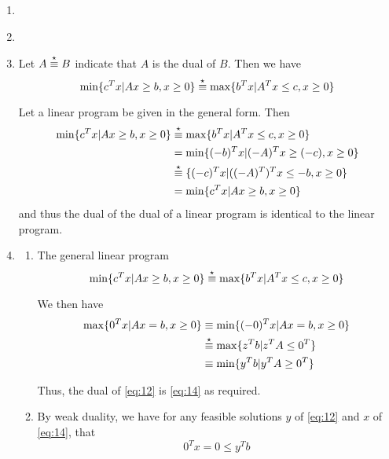 \begin{enumerate}
\item \label{item:2}
  
\item \label{item:3}
  
\item \label{item:4}
  Let $A \overset{\star}\equiv B$ indicate that $A$ is the dual of $B$.  Then we have
  \begin{equation}
    \label{eq:2}
    \min \{ c^{T}x | Ax \geq b, x \geq 0 \} \overset{\star}\equiv \max \{ b^{T} x |
    A^{T}x \leq c, x \geq 0 \}
  \end{equation}

  Let a linear program be given in the general form. Then
  \begin{align}
    \label{eq:3}
    \min \{ c^{T} x | Ax \geq b, x \geq 0 \} &\overset{\star}\equiv \max \{ b^{T} x |
    A^{T}x \leq c, x \geq 0 \} \\
    &= \min \{ (-b)^{T} x | (-A)^{T} x \geq (-c), x \geq 0 \} \\
    &\overset{\star}\equiv \{ (-c)^{T} x | ((-A)^{T})^{T} x \leq -b, x \geq 0 \} \\
    &= \min \{ c^{T}x | Ax \geq b, x \geq 0 \}
  \end{align}
  and thus the dual of the dual of a linear program is identical to
  the linear program.
\item \label{item:5}
  \begin{enumerate}
  \item The general linear program
    \begin{equation}
      \label{eq:11}
      \min \{ c^{T}x | Ax \geq b, x \geq 0 \} \overset{\star}\equiv \max \{ b^{T} x |
      A^{T}x \leq c, x \geq 0 \}
    \end{equation}

    We then have
    \begin{align}
      \label{eq:12}
      \max \{ 0^{T} x | Ax = b, x \geq 0 \}  &\equiv \min \{ (-0)^{T}
      x | Ax = b, x \geq 0 \} \\
      \label{eq:13}
      &\overset{\star}\equiv \max \{ z^{T}b | z^{T} A \leq 0^{T} \} \\
      \label{eq:14}
      &\equiv \min \{ y^{T}b | y^{T} A \geq 0^{T} \}
    \end{align}


    Thus, the dual of \eqref{eq:12} is \eqref{eq:14} as required.
  \item By weak duality, we have for any feasible solutions $y$ of
    \eqref{eq:12} and $x$ of \eqref{eq:14}, that
    \begin{equation}
      \label{eq:15}
      0^{T}x = 0 \leq y^{T}b
    \end{equation}


\end{enumerate}
\end{enumerate}
